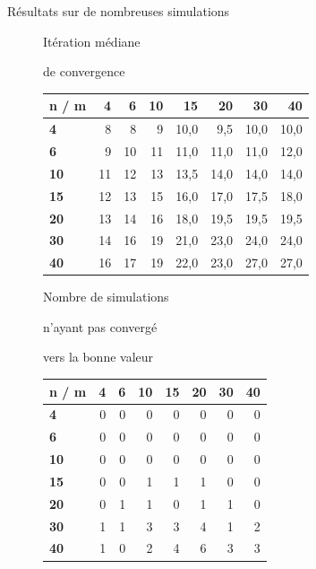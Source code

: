 \documentclass[10pt,xcolor=table,color={dvipsnames,usenames},ignorenonframetext,usepdftitle=false,french]{beamer}
\begin{document}
\begin{frame}{Résultats sur de nombreuses simulations}
\protect\hypertarget{ruxe9sultats-sur-de-nombreuses-simulations}{}

\tiny
\begin{figure}
\begin{minipage}{.4\textwidth}
\normalsize{Itération médiane

de convergence}
\end{minipage}%
\begin{minipage}{.6\textwidth}

\begin{tabular}{>{\bfseries}l|r|r|r|r|r|r|r}
\hline
\textbf{n / m } & \textbf{4} & \textbf{6} & \textbf{10} & \textbf{15} & \textbf{20} & \textbf{30} & \textbf{40}\\
\hline
4 & 8 & 8 & 9 & 10,0 & 9,5 & 10,0 & 10,0\\
\hline
6 & 9 & 10 & 11 & 11,0 & 11,0 & 11,0 & 12,0\\
\hline
10 & 11 & 12 & 13 & 13,5 & 14,0 & 14,0 & 14,0\\
\hline
15 & 12 & 13 & 15 & 16,0 & 17,0 & 17,5 & 18,0\\
\hline
20 & 13 & 14 & 16 & 18,0 & 19,5 & 19,5 & 19,5\\
\hline
30 & 14 & 16 & 19 & 21,0 & 23,0 & 24,0 & 24,0\\
\hline
40 & 16 & 17 & 19 & 22,0 & 23,0 & 27,0 & 27,0\\
\hline
\end{tabular}
\end{minipage}
\end{figure}

\begin{figure}
\begin{minipage}{.4\textwidth}
\normalsize{Nombre de simulations

n'ayant pas convergé

vers la bonne valeur}
\end{minipage}%
\begin{minipage}{.6\textwidth}

\begin{tabular}{>{\bfseries}l|r|r|r|r|r|r|r}
\hline
\textbf{n / m } & \textbf{4} & \textbf{6} & \textbf{10} & \textbf{15} & \textbf{20} & \textbf{30} & \textbf{40}\\
\hline
4 & 0 & 0 & 0 & 0 & 0 & 0 & 0\\
\hline
6 & 0 & 0 & 0 & 0 & 0 & 0 & 0\\
\hline
10 & 0 & 0 & 0 & 0 & 0 & 0 & 0\\
\hline
15 & 0 & 0 & 1 & 1 & 1 & 0 & 0\\
\hline
20 & 0 & 1 & 1 & 0 & 1 & 1 & 0\\
\hline
30 & 1 & 1 & 3 & 3 & 4 & 1 & 2\\
\hline
40 & 1 & 0 & 2 & 4 & 6 & 3 & 3\\
\hline
\end{tabular}
\end{minipage}
\end{figure}


\end{frame}
\end{document}
